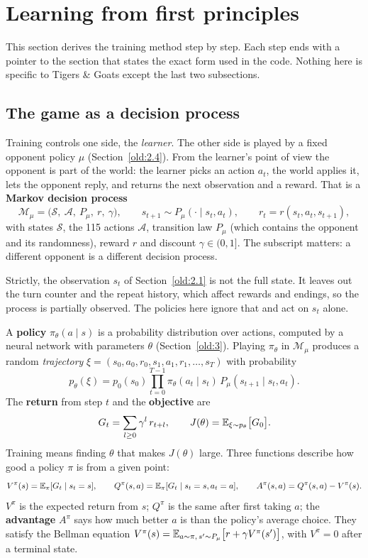 \section{Learning from first principles}\label{sec:fp}

This section derives the training method step by step. Each step ends with a pointer to the section that
states the exact form used in the code. Nothing here is specific to Tigers \& Goats except the last two
subsections.

\subsection{The game as a decision process}\label{sec:fp-mdp}

Training controls one side, the \emph{learner}. The other side is played by a fixed opponent policy $\mu$
(Section~\ref{old:2.4}). From the learner's point of view the opponent is part of the world: the learner
picks an action $a_t$, the world applies it, lets the opponent reply, and returns the next observation and
a reward. That is a \textbf{Markov decision process}
\[
\mathcal{M}_\mu = \big(\mathcal{S},\ \mathcal{A},\ P_\mu,\ r,\ \gamma\big),
\qquad s_{t+1} \sim P_\mu(\cdot \mid s_t, a_t), \qquad r_t = r(s_t, a_t, s_{t+1}),
\]
with states $\mathcal{S}$, the 115 actions $\mathcal{A}$, transition law $P_\mu$ (which contains the opponent and
its randomness), reward $r$ and discount $\gamma \in (0, 1]$. The subscript matters: a different opponent is a
different decision process.

Strictly, the observation $s_t$ of Section~\ref{old:2.1} is not the full state. It leaves out the turn
counter and the repeat history, which affect rewards and endings, so the process is partially observed. The
policies here ignore that and act on $s_t$ alone.

A \textbf{policy} $\pi_\theta(a \mid s)$ is a probability distribution over actions, computed by a neural network
with parameters $\theta$ (Section~\ref{old:3}). Playing $\pi_\theta$ in $\mathcal{M}_\mu$ produces a random
\emph{trajectory} $\xi = (s_0, a_0, r_0, s_1, a_1, r_1, \dots, s_T)$ with probability
\begin{equation}\label{eq:traj}
p_\theta(\xi) = p_0(s_0) \prod_{t=0}^{T-1} \pi_\theta(a_t \mid s_t)\, P_\mu(s_{t+1} \mid s_t, a_t).
\end{equation}
The \textbf{return} from step $t$ and the \textbf{objective} are
\begin{equation}\label{eq:objective}
G_t = \sum_{l \ge 0} \gamma^{l}\, r_{t+l},
\qquad
J(\theta) = \mathbb{E}_{\xi \sim p_\theta}\big[G_0\big].
\end{equation}
Training means finding $\theta$ that makes $J(\theta)$ large. Three functions describe how good a policy $\pi$
is from a given point:
\[
V^\pi(s) = \mathbb{E}_\pi[G_t \mid s_t = s], \qquad
Q^\pi(s, a) = \mathbb{E}_\pi[G_t \mid s_t = s, a_t = a], \qquad
A^\pi(s, a) = Q^\pi(s, a) - V^\pi(s).
\]
$V^\pi$ is the expected return from $s$; $Q^\pi$ is the same after first taking $a$; the \textbf{advantage} $A^\pi$
says how much better $a$ is than the policy's average choice. They satisfy the Bellman equation
$V^\pi(s) = \mathbb{E}_{a \sim \pi,\, s' \sim P_\mu}\big[r + \gamma V^\pi(s')\big]$, with $V^\pi = 0$ after a terminal state.


